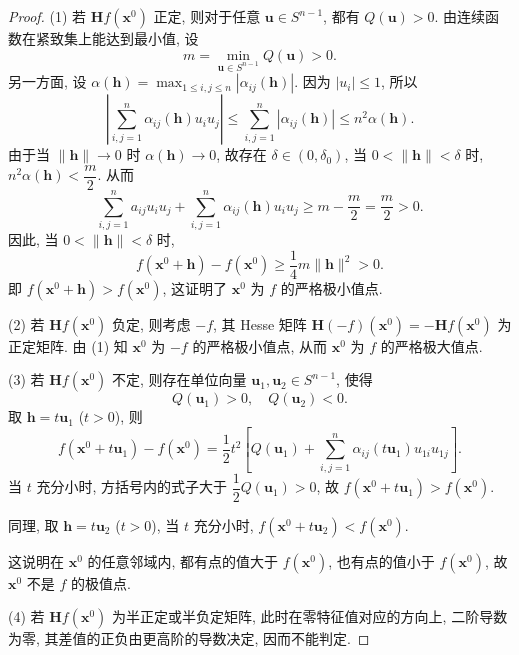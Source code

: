 \begin{proof}
(1) 若 $\boldsymbol{H}f(\boldsymbol{x}^{0})$ 正定, 则对于任意 $\boldsymbol{u} \in S^{n-1}$, 都有 $Q(\boldsymbol{u}) > 0$. 由连续函数在紧致集上能达到最小值, 设
\[
  m = \min_{\boldsymbol{u} \in S^{n-1}} Q(\boldsymbol{u}) > 0.
\]
另一方面, 设 $\alpha(\boldsymbol{h}) = \max_{1 \leqslant i,j \leqslant n} |\alpha_{ij}(\boldsymbol{h})|$. 因为 $|u_{i}| \leqslant 1$, 所以
\[
  \left| \sum_{i,j=1}^{n} \alpha_{ij}(\boldsymbol{h}) u_{i} u_{j} \right| \leqslant \sum_{i,j=1}^{n} |\alpha_{ij}(\boldsymbol{h})| \leqslant n^{2} \alpha(\boldsymbol{h}).
\]
由于当 $\|\boldsymbol{h}\| \to 0$ 时 $\alpha(\boldsymbol{h}) \to 0$, 故存在 $\delta \in (0, \delta_{0})$, 当 $0 < \|\boldsymbol{h}\| < \delta$ 时, $n^{2} \alpha(\boldsymbol{h}) < \dfrac{m}{2}$. 从而
\[
  \sum_{i,j=1}^{n} a_{ij} u_{i} u_{j} + \sum_{i,j=1}^{n} \alpha_{ij}(\boldsymbol{h}) u_{i} u_{j} \geqslant m - \frac{m}{2} = \frac{m}{2} > 0.
\]
因此, 当 $0 < \|\boldsymbol{h}\| < \delta$ 时,
\[
  f(\boldsymbol{x}^{0} + \boldsymbol{h}) - f(\boldsymbol{x}^{0}) \geqslant \frac{1}{4} m \|\boldsymbol{h}\|^{2} > 0.
\]
即 $f(\boldsymbol{x}^{0} + \boldsymbol{h}) > f(\boldsymbol{x}^{0})$, 这证明了 $\boldsymbol{x}^{0}$ 为 $f$ 的严格极小值点.

(2) 若 $\boldsymbol{H}f(\boldsymbol{x}^{0})$ 负定, 则考虑 $-f$, 其 Hesse 矩阵 $\boldsymbol{H}(-f)(\boldsymbol{x}^{0}) = -\boldsymbol{H}f(\boldsymbol{x}^{0})$ 为正定矩阵. 由 (1) 知 $\boldsymbol{x}^{0}$ 为 $-f$ 的严格极小值点, 从而 $\boldsymbol{x}^{0}$ 为 $f$ 的严格极大值点.

(3) 若 $\boldsymbol{H}f(\boldsymbol{x}^{0})$ 不定, 则存在单位向量 $\boldsymbol{u}_{1}, \boldsymbol{u}_{2} \in S^{n-1}$, 使得
\[
  Q(\boldsymbol{u}_{1}) > 0, \quad Q(\boldsymbol{u}_{2}) < 0.
\]
取 $\boldsymbol{h} = t \boldsymbol{u}_{1}$ ($t > 0$), 则
\[
  f(\boldsymbol{x}^{0} + t\boldsymbol{u}_{1}) - f(\boldsymbol{x}^{0}) = \frac{1}{2} t^{2} \left[ Q(\boldsymbol{u}_{1}) + \sum_{i,j=1}^{n} \alpha_{ij}(t\boldsymbol{u}_{1}) u_{1i} u_{1j} \right].
\]
当 $t$ 充分小时, 方括号内的式子大于 $\dfrac{1}{2} Q(\boldsymbol{u}_{1}) > 0$, 故 $f(\boldsymbol{x}^{0} + t\boldsymbol{u}_{1}) > f(\boldsymbol{x}^{0})$.

同理, 取 $\boldsymbol{h} = t \boldsymbol{u}_{2}$ ($t > 0$), 当 $t$ 充分小时, $f(\boldsymbol{x}^{0} + t\boldsymbol{u}_{2}) < f(\boldsymbol{x}^{0})$.

这说明在 $\boldsymbol{x}^{0}$ 的任意邻域内, 都有点的值大于 $f(\boldsymbol{x}^{0})$, 也有点的值小于 $f(\boldsymbol{x}^{0})$, 故 $\boldsymbol{x}^{0}$ 不是 $f$ 的极值点.

(4) 若 $\boldsymbol{H}f(\boldsymbol{x}^{0})$ 为半正定或半负定矩阵, 此时在零特征值对应的方向上, 二阶导数为零, 其差值的正负由更高阶的导数决定, 因而不能判定.
\end{proof}

